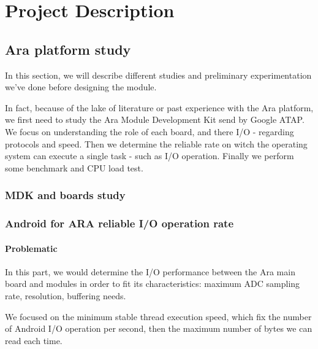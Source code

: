 
\chapter{Project Description}

\label{ProjectD}



\section{Ara platform study}

In this section, we will describe different studies and preliminary experimentation we've done before designing  the module.

In fact, because of the lake of literature or past experience with the Ara platform, we first need to study the Ara Module Development Kit send by Google ATAP. We focus on understanding the role of each board, and there I/O - regarding protocols and speed. Then we determine the reliable rate on witch the operating system can execute a single task - such as I/O operation. Finally we perform some benchmark and CPU load test. 

\subsection{MDK and boards study}

\subsection{Android for ARA reliable I/O operation rate}  \label{result-ara}

\subsubsection{Problematic}

In this part, we would determine the I/O performance between the Ara main board and  modules in order to fit its characteristics: maximum ADC sampling rate, resolution, buffering needs.

We focused on the minimum stable thread execution speed, which fix the number of Android I/O operation per second, then the maximum number of bytes we can read each time.

